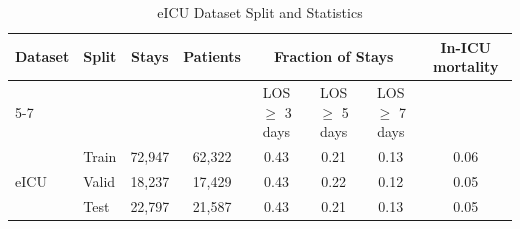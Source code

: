 \begin{table}[H]
\centering
\caption{eICU Dataset Split and Statistics}
\label{tab:eicu-dataset-split}
\begin{tabular}{|l|l|c|c|c|c|c|c|}
\hline
\multirow{2}{*}{Dataset} & \multirow{2}{*}{Split} & \multirow{2}{*}{Stays} & \multirow{2}{*}{Patients} & \multicolumn{3}{c|}{Fraction of Stays} & \multirow{2}{*}{In-ICU mortality}\\ \cline{5-7}
 &  &  &  & LOS $\geq$ 3 days & LOS $\geq$ 5 days & LOS $\geq$ 7 days & \\ \hline
\multirow{3}{*}{eICU} & Train & 72,947 & 62,322 & 0.43 & 0.21 & 0.13 &0.06 \\ \cline{2-8}
 & Valid & 18,237 & 17,429 & 0.43 & 0.22 & 0.12 & 0.05\\ \cline{2-8}
 & Test & 22,797 & 21,587 & 0.43 & 0.21 & 0.13 & 0.05 \\ \hline
\end{tabular}
\end{table}